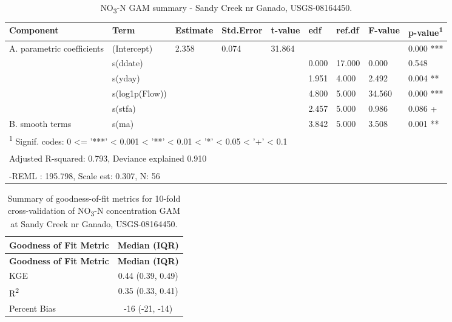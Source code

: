 \documentclass[
]{article}
\newenvironment{widestuff}{\begin{table}[h]\begin{adjustwidth}{-4.5cm}{-4.5cm}\centering}{\end{adjustwidth}\end{table}}
\begin{document}
\begin{widestuff}

\caption{NO\textsubscript{3}-N GAM summary - Sandy Creek nr Ganado, USGS-08164450.}
\centering
\begin{tabular}[t]{lllllllll}
\toprule
Component & Term & Estimate & Std.Error & t-value & edf & ref.df & F-value & p-value\textsuperscript{1}\\
\midrule
A. parametric coefficients & (Intercept) & 2.358 & 0.074 & 31.864 &  &  &  & 0.000 ***\\
\cmidrule{1-9}
 & s(ddate) &  &  &  & 0.000 & 17.000 & 0.000 & 0.548\\

 & s(yday) &  &  &  & 1.951 & 4.000 & 2.492 & 0.004 **\\

 & s(log1p(Flow)) &  &  &  & 4.800 & 5.000 & 34.560 & 0.000 ***\\

 & s(stfa) &  &  &  & 2.457 & 5.000 & 0.986 & 0.086 +\\

\multirow[t]{-5}{*}{\raggedright\arraybackslash B. smooth terms} & s(ma) &  &  &  & 3.842 & 5.000 & 3.508 & 0.001 **\\
\bottomrule
\multicolumn{9}{l}{\textsuperscript{1} Signif. codes: 0 <= '***' < 0.001 < '**' < 0.01 < '*' < 0.05 < '+' < 0.1}\\
\multicolumn{9}{l}{\textsuperscript{} Adjusted R-squared: 0.793, Deviance explained 0.910}\\
\multicolumn{9}{l}{\textsuperscript{} -REML : 195.798, Scale est: 0.307, N: 56}\\
\end{tabular}
\end{widestuff}

\hypertarget{tbl-NO308164450-CV}{}
\begin{longtable}[]{@{}lc@{}}
\caption{\label{tbl-NO308164450-CV}Summary of goodness-of-fit metrics
for 10-fold cross-validation of NO\textsubscript{3}-N concentration GAM
at Sandy Creek nr Ganado, USGS-08164450.}\tabularnewline
\toprule()
\textbf{Goodness of Fit Metric} & \textbf{Median (IQR)} \\
\midrule()
\endfirsthead
\toprule()
\textbf{Goodness of Fit Metric} & \textbf{Median (IQR)} \\
\midrule()
\endhead
KGE & 0.44 (0.39, 0.49) \\
R\textsuperscript{2} & 0.35 (0.33, 0.41) \\
Percent Bias & -16 (-21, -14) \\
\bottomrule()
\end{longtable}
\end{document}
